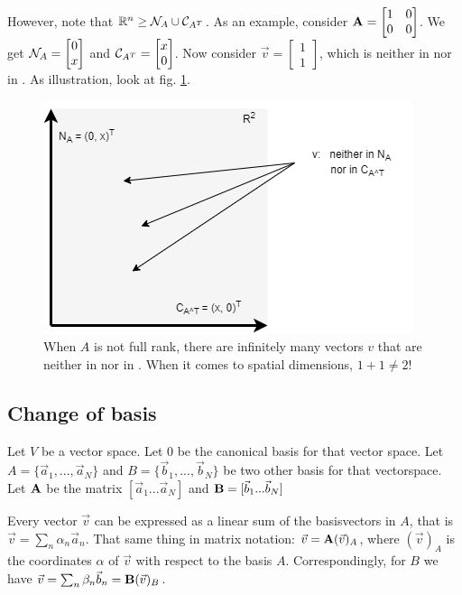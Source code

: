 However, note that $\mathbb{R}^n \geq \mathcal{N}_{A} \cup \mathcal{C}_{A^T}$. As an example, consider $\mathbf{A} = \begin{bmatrix}
    1 & 0 \\
    0 & 0
\end{bmatrix}$. We get $\mathcal{N}_{A} = \begin{bmatrix}
    0 \\ x
\end{bmatrix}$ and $\mathcal{C}_{A^T} = \begin{bmatrix}
    x \\ 0
\end{bmatrix}$. Now consider $\vec{v} = \begin{bmatrix}
    1 \\ 1
\end{bmatrix}$, which is neither in  nor in . As illustration, look at fig. \ref{nullspace_rowspace_lowrank}.

\begin{figure}[H] \label{nullspace_rowspace_lowrank}
    \caption{When $A$ is not full rank, there are infinitely many vectors $v$ that are neither in  nor in . When it comes to spatial dimensions, $1 + 1 \neq 2$!}
    \centering
    \includegraphics[width=0.5\linewidth]{images/nullspace_rowspace_lowrank.png}
\end{figure}





\subsection{Change of basis}\label{changeOfBasis}

Let $V$ be a vector space. Let $0$ be the canonical basis for that vector space. Let $A = \{\vec{a}_1, ..., \vec{a}_N \}$ and $B = \{\vec{b}_1, ..., \vec{b}_N\}$ be two other basis for that vectorspace. Let $\mathbf{A}$ be the matrix $[\vec{a}_1  ...  \vec{a}_N]$ and $\mathbf{B} = [\vec{b}_1 ... \vec{b}_N]$

Every vector $\vec{v}$ can be expressed as a linear sum of the basisvectors in $A$, that is $\vec{v} = \sum_n \alpha_n \vec{a}_n$. That same thing in matrix notation: $\vec{v} = \mathbf{A}(\vec{v})_A$, where $(\vec{v})_A$ is the coordinates $\alpha$ of $\vec{v}$ with respect to the basis $A$. Correspondingly, for $B$ we have $\vec{v} = \sum_n \beta_n \vec{b}_n = \mathbf{B}(\vec{v})_B$.

